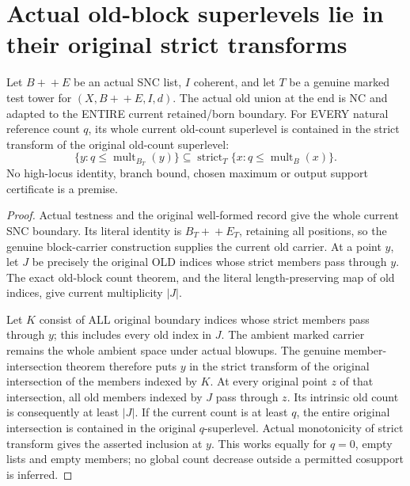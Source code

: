 \section{Actual old-block superlevels lie in their original strict transforms}
\label{sec:nc-old-block-superlevels}

\begin{theorem}
\label{hir:nc-old-block-current-high-subset-strict-original-high}
\leanok
Let $B+\!+E$ be an actual SNC list, $I$ coherent, and let $T$ be a genuine
marked test tower for $(X,B+\!+E,I,d)$. The actual old union at the end is
NC and adapted to the ENTIRE current retained/born boundary. For EVERY
natural reference count $q$, its whole current old-count superlevel is
contained in the strict transform of the original old-count superlevel:
\[
 \{y:q\le\operatorname{mult}_{B_T}(y)\}
 \subseteq \operatorname{strict}_T\{x:q\le\operatorname{mult}_{B}(x)\}.
\]
No high-locus identity, branch bound, chosen maximum or output support
certificate is a premise.
\end{theorem}
\begin{proof}
Actual testness and the original well-formed record give the whole current
SNC boundary. Its literal identity is $B_T+\!+E_T$, retaining all positions,
so the genuine block-carrier construction supplies the current old carrier.
At a point $y$, let $J$ be precisely the original OLD indices whose strict
members pass through $y$. The exact old-block count theorem, and the literal
length-preserving map of old indices, give current multiplicity $|J|$.

Let $K$ consist of ALL original boundary indices whose strict members pass
through $y$; this includes every old index in $J$. The ambient marked carrier
remains the whole ambient space under actual blowups. The genuine
member-intersection theorem therefore puts $y$ in the strict transform of
the original intersection of the members indexed by $K$. At every original
point $z$ of that intersection, all old members indexed by $J$ pass through
$z$. Its intrinsic old count is consequently at least $|J|$. If the current
count is at least $q$, the entire original intersection is contained in the
original $q$-superlevel. Actual monotonicity of strict transform gives the
asserted inclusion at $y$. This works equally for $q=0$, empty lists and
empty members; no global count decrease outside a permitted cosupport is
inferred.
\end{proof}
